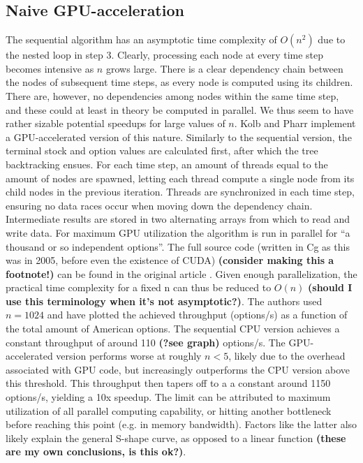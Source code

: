 \documentclass[english,12pt,a4paper,pdftex,sci,utf8]{aaltothesis}
\begin{document}
\subsection{Naive GPU-acceleration}
The sequential algorithm has an asymptotic time complexity of $O(n^2)$ due to the nested loop in step 3. Clearly, processing each node at every time step becomes intensive as $n$ grows large. There is a clear dependency chain between the nodes of subsequent time steps, as every node is computed using its children. There are, however, no dependencies among nodes within the same time step, and these could at least in theory be computed in parallel. We thus seem to have rather sizable potential speedups for large values of $n$. Kolb and Pharr \cite{pharr2005gpu} implement a GPU-accelerated version of this nature. Similarly to the sequential version, the terminal stock and option values are calculated first, after which the tree backtracking ensues. For each time step, an amount of threads equal to the amount of nodes are spawned, letting each thread compute a single node from its child nodes in the previous iteration. Threads are synchronized in each time step, ensuring no data races occur when moving down the dependency chain. Intermediate results are stored in two alternating arrays from which to read and write data. For maximum GPU utilization the algorithm is run in parallel for ``a thousand or so independent options''. The full source code (written in Cg as this was in 2005, before even the existence of CUDA) \textbf{(consider making this a footnote!)} can be found in the original article \cite{pharr2005gpu}. Given enough parallelization, the practical time complexity for a fixed n can thus be reduced to $O(n)$ \textbf{(should I use this terminology when it's not asymptotic?)}. The authors used $n=1024$ and have plotted the achieved throughput (options/s) as a function of the total amount of American options. The sequential CPU version achieves a constant throughput of around 110 \textbf{(?see graph)} options/s. The GPU-accelerated version performs worse at roughly $n < 5$, likely due to the overhead associated with GPU code, but increasingly outperforms the CPU version above this threshold. This throughput then tapers off to a a constant around 1150 options/s, yielding a 10x speedup. The limit can be attributed to maximum utilization of all parallel computing capability, or hitting another bottleneck before reaching this point (e.g. in memory bandwidth). Factors like the latter also likely explain the general S-shape curve, as opposed to a linear function \textbf{(these are my own conclusions, is this ok?)}.
\end{document}
